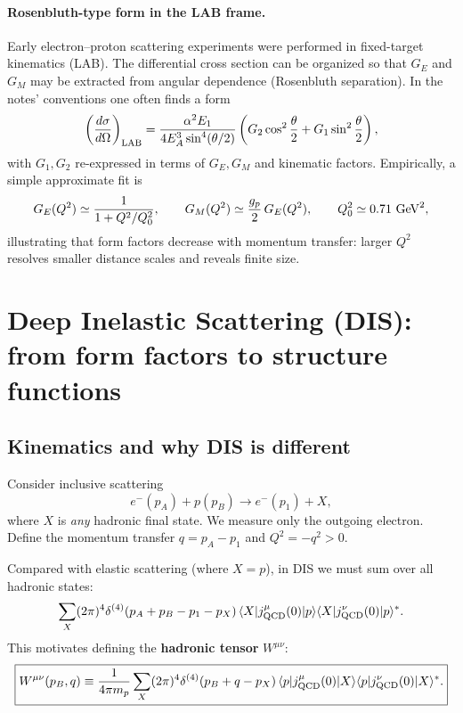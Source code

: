 \paragraph{Rosenbluth-type form in the LAB frame.}
Early electron--proton scattering experiments were performed in fixed-target kinematics (LAB).
The differential cross section can be organized so that $G_E$ and $G_M$ may be extracted
from angular dependence (Rosenbluth separation). In the notes' conventions one often finds a form
\begin{equation}
\left(\frac{d\sigma}{d\Omega}\right)_{\rm LAB}
= \frac{\alpha^2 E_1}{4E_A^3\sin^4(\theta/2)}
\left(G_2\cos^2\frac{\theta}{2}+G_1\sin^2\frac{\theta}{2}\right),
\end{equation}
with $G_1,G_2$ re-expressed in terms of $G_E,G_M$ and kinematic factors.
Empirically, a simple approximate fit is
\begin{equation}
G_E(Q^2)\simeq \frac{1}{1+Q^2/Q_0^2},
\qquad
G_M(Q^2)\simeq \frac{g_p}{2}\,G_E(Q^2),
\qquad
Q_0^2\simeq 0.71~{\rm GeV}^2,
\end{equation}
illustrating that form factors decrease with momentum transfer: larger $Q^2$ resolves
smaller distance scales and reveals finite size.

\section{Deep Inelastic Scattering (DIS): from form factors to structure functions}
\subsection{Kinematics and why DIS is different}
Consider inclusive scattering
\[
e^-(p_A)+p(p_B)\to e^-(p_1)+X,
\]
where $X$ is \emph{any} hadronic final state. We measure only the outgoing electron.
Define the momentum transfer $q=p_A-p_1$ and $Q^2=-q^2>0$.

Compared with elastic scattering (where $X=p$), in DIS we must sum over all hadronic states:
\begin{equation}
\sum_X (2\pi)^4 \delta^{(4)}(p_A+p_B-p_1-p_X)\,
\langle X|j^\mu_{\rm QCD}(0)|p\rangle
\langle X|j^\nu_{\rm QCD}(0)|p\rangle^\ast.
\end{equation}
This motivates defining the \textbf{hadronic tensor} $W^{\mu\nu}$:
\begin{equation}
\boxed{
W^{\mu\nu}(p_B,q)
\equiv \frac{1}{4\pi m_p}\sum_X (2\pi)^4\delta^{(4)}(p_B+q-p_X)\,
\langle p|j^\mu_{\rm QCD}(0)|X\rangle
\langle p|j^\nu_{\rm QCD}(0)|X\rangle^\ast.
}
\end{equation}

